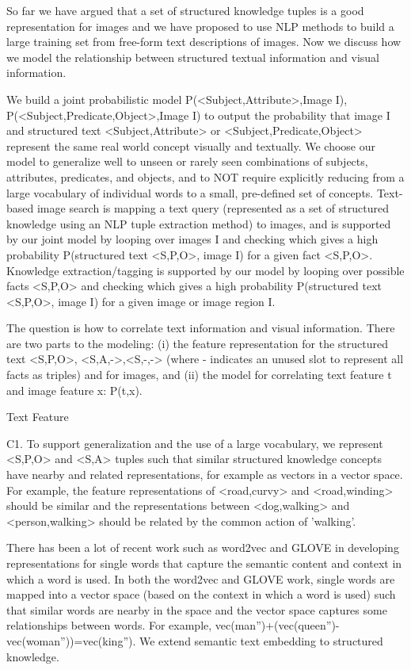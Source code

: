 \documentclass[runningheads]{llncs}
\begin{document}
So far we have argued that a set of structured knowledge tuples is a good representation for images and we have proposed to use NLP methods to build a large training set from free-form text descriptions of images. Now we discuss how we model the relationship between structured textual information and visual information.


We build a joint probabilistic model P(<Subject,Attribute>,Image I), P(<Subject,Predicate,Object>,Image I) to output the probability that image I and structured text <Subject,Attribute> or <Subject,Predicate,Object> represent the same real world concept visually and textually. We choose our model to generalize well to unseen or rarely seen combinations of subjects, attributes, predicates, and objects, and to NOT require explicitly reducing from a large vocabulary of individual words to a small, pre-defined set of concepts. Text-based image search is mapping a text query (represented as a set of structured knowledge using an NLP tuple extraction method) to images, and is supported by our joint model by looping over images I and checking which gives a high probability P(structured text <S,P,O>, image I) for a given fact <S,P,O>. Knowledge extraction/tagging is supported by our model by looping over possible facts <S,P,O> and checking which gives a high probability P(structured text <S,P,O>, image I) for a given image or image region I.


The question is how to correlate text information and visual information. There are two parts to the modeling: (i) the feature representation for the structured text <S,P,O>, <S,A,->,<S,-,-> (where - indicates an unused slot to represent all facts as triples) and for images, and (ii) the model for correlating text feature t and image feature x: P(t,x).


Text Feature


C1. To support generalization and the use of a large vocabulary, we represent <S,P,O> and <S,A> tuples such that similar structured knowledge concepts have nearby and related representations, for example as vectors in a vector space. For example, the feature representations of <road,curvy> and <road,winding> should be similar and the representations between <dog,walking> and <person,walking> should be related by the common action of 'walking'.


There has been a lot of recent work such as word2vec and GLOVE in developing representations for single words that capture the semantic content and context in which a word is used. In both the word2vec and GLOVE work, single words are mapped into a vector space (based on the context in which a word is used) such that similar words are nearby in the space and the vector space captures some relationships between words. For example, vec(man”)+(vec(queen”)-vec(woman”))=vec(king”). We extend semantic text embedding to structured knowledge.
\end{document}
